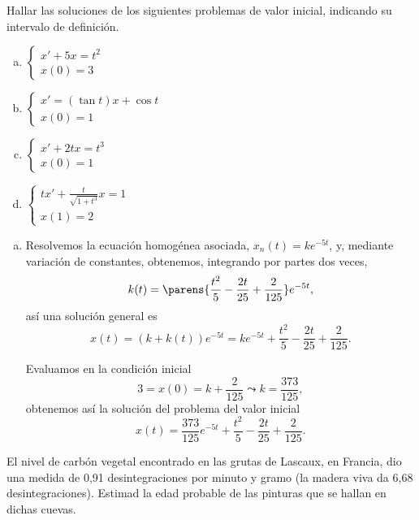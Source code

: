 \documentclass[../main.tex]{subfiles}
\begin{document}
\begin{problem}
	Hallar las soluciones de los siguientes problemas de valor inicial, 
	indicando su intervalo de definición.
	\begin{multicols}{2}
	\begin{enumerate}[a)]
		\item \(\displaystyle 
				\begin{cases}
					x' + 5x = t^2 \\
					x(0) = 3
				\end{cases}\)

		\item \(\displaystyle 
				\begin{cases}
					x' = (\tan t)x + \cos t \\
					x(0) = 1
				\end{cases}\)

		\item \(\displaystyle 
				\begin{cases}
					x' + 2tx = t^3 \\
					x(0) = 1
				\end{cases}\)

		\item \(\displaystyle 
				\begin{cases}
					tx' + \frac{t}{\sqrt{1 + t^3}}x = 1 \\
					x(1) = 2
				\end{cases}\)
	\end{enumerate}
	\end{multicols}
\end{problem}

\begin{solution}
	\begin{enumerate}[a), wide, labelwidth=0pt, labelindent=0pt]
		\item Resolvemos la ecuación homogénea asociada, \(x_n(t) = k e^{-5t}\),
			y, mediante variación de constantes, obtenemos, integrando por
			partes dos veces, 
			\[k(t) = \parens{\frac{t^2}{5} - \frac{2t}{25} 
				+ \frac{2}{125}} e^{-5t},\]
			así una solución general es
			\[x(t) = (k + k(t)) e^{-5t}
				= k e^{-5t} + \frac{t^2}{5} - \frac{2t}{25} + \frac{2}{125}.\]

			Evaluamos en la condición inicial
			\[3 = x(0) = k + \frac{2}{125} \leadsto k = \frac{373}{125},\]
			obtenemos así la solución del problema del valor inicial
			\[x(t) =  \frac{373}{125} e^{-5t} + \frac{t^2}{5} - \frac{2t}{25} 
				+ \frac{2}{125}.\]
	\end{enumerate}
\end{solution}


\begin{problem}
	El nivel de carbón vegetal encontrado en las grutas de Lascaux, en Francia, 
	dio una medida de 0,91 desintegraciones por minuto y gramo (la madera viva 
	da 6,68 desintegraciones). Estimad la edad probable de las pinturas que se 
	hallan en dichas cuevas.
\end{problem}
\end{document}
